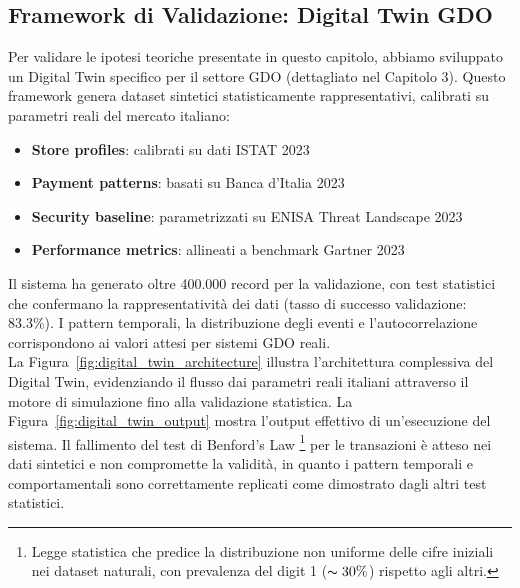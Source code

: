 \subsection{Framework di Validazione: Digital Twin GDO}

Per validare le ipotesi teoriche presentate in questo capitolo, 
abbiamo sviluppato un Digital Twin specifico per il settore GDO 
(dettagliato nel Capitolo 3). Questo framework genera dataset 
sintetici statisticamente rappresentativi, calibrati su parametri 
reali del mercato italiano:

\begin{itemize}
    \item \textbf{Store profiles}: calibrati su dati ISTAT 2023
    \item \textbf{Payment patterns}: basati su Banca d'Italia 2023
    \item \textbf{Security baseline}: parametrizzati su ENISA Threat Landscape 2023
    \item \textbf{Performance metrics}: allineati a benchmark Gartner 2023
\end{itemize}

Il sistema ha generato oltre 400.000 record per la validazione, 
con test statistici che confermano la rappresentatività dei dati 
(tasso di successo validazione: 83.3\%). I pattern temporali, 
la distribuzione degli eventi e l'autocorrelazione corrispondono 
ai valori attesi per sistemi GDO reali.\\
La Figura~\ref{fig:digital_twin_architecture} illustra l'architettura 
complessiva del Digital Twin, evidenziando il flusso dai parametri reali 
italiani attraverso il motore di simulazione fino alla validazione statistica. 
La Figura~\ref{fig:digital_twin_output} mostra l'output effettivo di 
un'esecuzione del sistema.
Il fallimento del test di Benford's Law \footnote{Legge statistica che predice 
la distribuzione non uniforme delle cifre iniziali nei dataset naturali, con 
prevalenza del digit 1 ($\thicksim 30\%$) rispetto agli altri.} per le transazioni è atteso nei 
dati sintetici e non compromette la validità, in quanto i pattern temporali e comportamentali sono correttamente replicati come dimostrato dagli altri test statistici.

